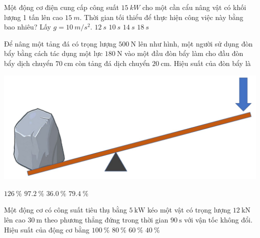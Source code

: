 \begin{ex}
	Một động cơ điện cung cấp công suất $\SI{15}{kW}$ cho một cần cẩu nâng vật có khối lượng 1 tấn lên cao $\SI{15}{m}$. Thời gian tối thiểu để thực hiện công việc này bằng bao nhiêu? Lấy $g=\SI{10}{m/s^2}$.
	\choice
	{$\SI{12}{s}$}
	{\True $\SI{10}{s}$}
	{$\SI{14}{s}$}
	{$\SI{18}{s}$}
\end{ex}
\begin{ex}
	Để nâng một tảng đá có trọng lượng $\SI{500}{\newton}$ lên như hình, một người sử dụng đòn bẩy bằng cách tác dụng một lực $\SI{180}{\newton}$ vào một đầu đòn bẩy làm cho đầu đòn bẩy dịch chuyển $\SI{70}{\centi\meter}$ còn tảng đá dịch chuyển $\SI{20}{\centi\meter}$. Hiệu suất của đòn bẩy là
	\begin{center}
		\includegraphics[width=0.4\linewidth]{../figs/VN10-2022-PH-TP023-P-12}
	\end{center}
	\choice
	{$\SI{126}{\percent}$}
	{$\SI{97.2}{\percent}$}
	{$\SI{36.0}{\percent}$}
	{\True $\SI{79.4}{\percent}$}
	\loigiai{}
\end{ex}
\begin{ex}
	Một động cơ có công suất tiêu thụ bằng $\SI{5}{\kilo\watt}$ kéo một vật có trọng lượng $\SI{12}{\kilo\newton}$ lên cao $\SI{30}{\meter}$ theo phương thẳng đứng trong thời gian $\SI{90}{\second}$ với vận tốc không đổi. Hiệu suất của động cơ bằng
	\choice
	{$\SI{100}{\percent}$}
	{\True $\SI{80}{\percent}$}
	{$\SI{60}{\percent}$}
	{$\SI{40}{\percent}$}
\end{ex}
